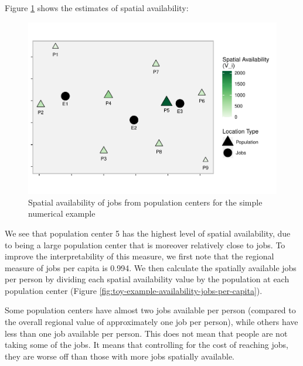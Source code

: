\documentclass[]{elsarticle} %
\begin{document}
Figure \ref{fig:toy-example-availability-jobs} shows the estimates of
spatial availability:

\begin{figure}
\includegraphics[width=1\linewidth]{Spatial-Availability_files/figure-latex/toy-example-availability-jobs-1} \caption{\label{fig:toy-example-availability-jobs}Spatial availability of jobs from population centers for the simple numerical example}\label{fig:toy-example-availability-jobs}
\end{figure}

We see that population center 5 has the highest level of spatial
availability, due to being a large population center that is moreover
relatively close to jobs. To improve the interpretability of this
measure, we first note that the regional measure of jobs per capita is
0.994. We then calculate the spatially available jobs per person by
dividing each spatial availability value by the population at each
population center (Figure
\ref{fig:toy-example-availability-jobs-per-capita}).

Some population centers have almost two jobs available per person
(compared to the overall regional value of approximately one job per
person), while others have less than one job available per person. This
does not mean that people are not taking some of the jobs. It means that
controlling for the cost of reaching jobs, they are worse off than those
with more jobs spatially available.
\end{document}
